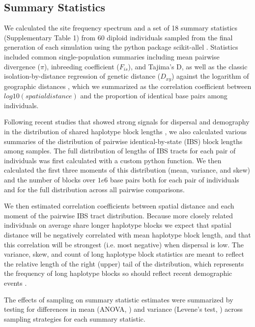 \documentclass[9pt,twocolumn,twoside,lineno]{gsajnl}
\begin{document}
\subsection{Summary Statistics}
We calculated the site frequency spectrum and a set of 18 summary statistics (Supplementary Table 1) from 60 diploid individuals sampled from the final generation of each simulation using the python package scikit-allel \citep{Miles2017}. Statistics included common single-population summaries including mean pairwise divergence ($\pi$), inbreeding coefficient ($F_{is}$), and Tajima's D, as well as the classic isolation-by-distance regression of genetic distance ($D_{xy}$) against the logarithm of geographic distances \citep{Rousset1997}, which we summarized as the correlation coefficient between $log10(spatial distance)$ and the proportion of identical base pairs among individuals. 

Following recent studies that showed strong signals for dispersal and demography in the distribution of shared haplotype block lengths \citep{Ringbauer2017,Baharian2016}, we also calculated various summaries of the distribution of pairwise identical-by-state (IBS) block lengths among samples. The full distribution of lengths of IBS tracts for each pair of individuals was first calculated with a custom python function. We then calculated the first three moments of this distribution (mean, variance, and skew) and the number of blocks over $1e6$ base pairs both for each pair of individuals and for the full distribution across all pairwise comparisons. 

We then estimated correlation coefficients between spatial distance and each moment of the pairwise IBS tract distribution. Because more closely related individuals on average share longer haplotype blocks we expect that spatial distance will be negatively correlated with mean haplotype block length, and that this correlation will be strongest (i.e. most negative) when dispersal is low. The variance, skew, and count of long haplotype block statistics are meant to reflect the relative length of the right (upper) tail of the distribution, which represents the frequency of long haplotype blocks so should reflect recent demographic events \citep{Ringbauer2017}. 

The effects of sampling on summary statistic estimates were summarized by testing for differences in mean (ANOVA, \citep{Rcore2018}) and variance (Levene's test, \citep{Fox2011}) across sampling strategies for each summary statistic. 
\end{document}

